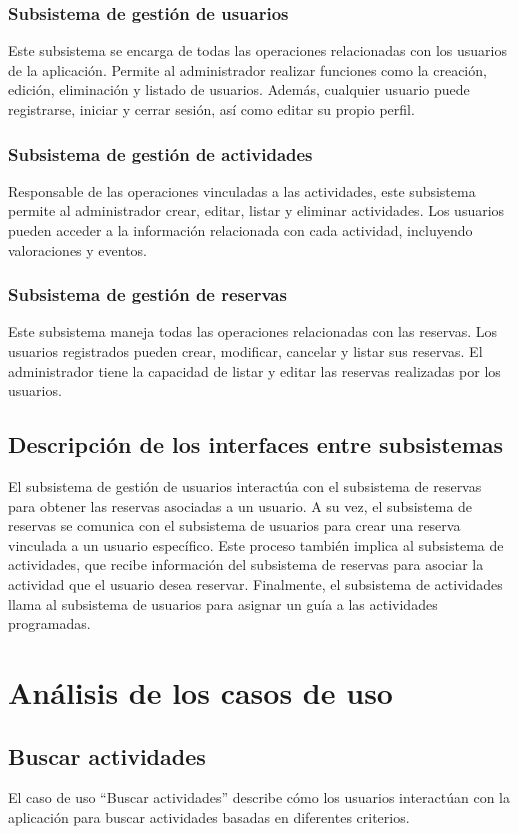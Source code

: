 \subsubsection{Subsistema de gestión de usuarios}
Este subsistema se encarga de todas las operaciones relacionadas con los usuarios de la aplicación. Permite al administrador realizar funciones como la creación, edición, eliminación y listado de usuarios. Además, cualquier usuario puede registrarse, iniciar y cerrar sesión, así como editar su propio perfil.
\subsubsection{Subsistema de gestión de actividades}
Responsable de las operaciones vinculadas a las actividades, este subsistema permite al administrador crear, editar, listar y eliminar actividades. Los usuarios pueden acceder a la información relacionada con cada actividad, incluyendo valoraciones y eventos.
\subsubsection{Subsistema de gestión de reservas}
Este subsistema maneja todas las operaciones relacionadas con las reservas. Los usuarios registrados pueden crear, modificar, cancelar y listar sus reservas. El administrador tiene la capacidad de listar y editar las reservas realizadas por los usuarios.
\subsection*{Descripción de los interfaces entre subsistemas}

El subsistema de gestión de usuarios interactúa con el subsistema de reservas para obtener las reservas asociadas a un usuario. A su vez, el subsistema de reservas se comunica con el subsistema de usuarios para crear una reserva vinculada a un usuario específico. Este proceso también implica al subsistema de actividades, que recibe información del subsistema de reservas para asociar la actividad que el usuario desea reservar. Finalmente, el subsistema de actividades llama al subsistema de usuarios para asignar un guía a las actividades programadas.
\section{Análisis de los casos de uso}
\subsection{Buscar actividades}
El caso de uso “Buscar actividades” describe cómo los usuarios interactúan con la aplicación para buscar actividades basadas en diferentes criterios.

